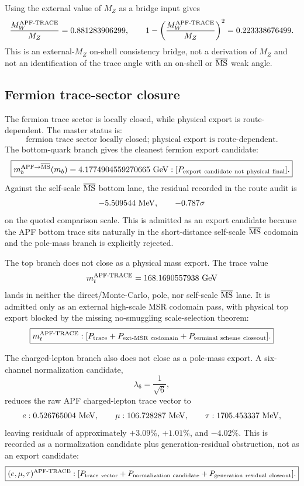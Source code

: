 Using the external value of \(M_Z\) as a bridge input gives
\[
\frac{M_W^{\rm APF\text{-}TRACE}}{M_Z}=0.881283906299,
\qquad
1-\left(\frac{M_W^{\rm APF\text{-}TRACE}}{M_Z}\right)^2=0.223338676499.
\]
This is an external-\(M_Z\) on-shell consistency bridge, not a derivation of \(M_Z\) and not an identification of the trace angle with an on-shell or \(\overline{\rm MS}\) weak angle.

\subsection{Fermion trace-sector closure}
\label{subsec:fermion-trace-sector-closure}

The fermion trace sector is locally closed, while physical export is route-dependent.  The master status is:
\[
\boxed{
\text{fermion trace sector locally closed; physical export is route-dependent.}
}
\]
The bottom-quark branch gives the cleanest fermion export candidate:
\[
\boxed{
 m_b^{\rm APF\to\overline{MS}}(m_b)
 =4.1774904559270665\ {\rm GeV}
 :[P_{\rm export\ candidate\ not\ physical\ final}].
}
\]
Against the self-scale \(\overline{\rm MS}\) bottom lane, the residual recorded in the route audit is
\[
-5.509544\ {\rm MeV},
\qquad
-0.787\sigma
\]
on the quoted comparison scale.  This is admitted as an export candidate because the APF bottom trace sits naturally in the short-distance self-scale \(\overline{\rm MS}\) codomain and the pole-mass branch is explicitly rejected.

The top branch does not close as a physical mass export.  The trace value
\[
 m_t^{\rm APF\text{-}TRACE}=168.1690557938\ {\rm GeV}
\]
lands in neither the direct/Monte-Carlo, pole, nor self-scale \(\overline{\rm MS}\) lane.  It is admitted only as an external high-scale MSR codomain pass, with physical top export blocked by the missing no-smuggling scale-selection theorem:
\[
\boxed{
 m_t^{\rm APF\text{-}TRACE}:
 [P_{\rm trace}+P_{\rm ext\text{-}MSR\ codomain}+P_{\rm terminal\ scheme\ closeout}].
}
\]

The charged-lepton branch also does not close as a pole-mass export.  A six-channel normalization candidate,
\[
\lambda_6=\frac{1}{\sqrt{6}},
\]
reduces the raw APF charged-lepton trace vector to
\[
 e:0.526765004\ {\rm MeV},
\qquad
 \mu:106.728287\ {\rm MeV},
\qquad
 \tau:1705.453337\ {\rm MeV},
\]
leaving residuals of approximately \(+3.09\%\), \(+1.01\%\), and \(-4.02\%\).  This is recorded as a normalization candidate plus generation-residual obstruction, not as an export candidate:
\[
\boxed{
(e,\mu,\tau)^{\rm APF\text{-}TRACE}:
[P_{\rm trace\ vector}+P_{\rm normalization\ candidate}+P_{\rm generation\ residual\ closeout}].
}
\]

